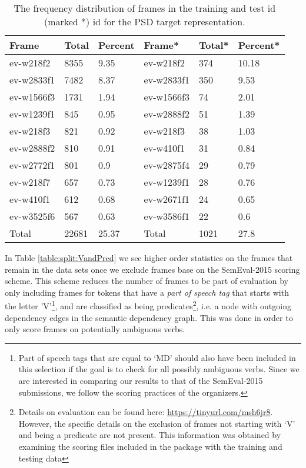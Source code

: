 \begin{table}
    \centering
    \smaller[0.7]
    \begin{tabular}{@{}llllll@{}}
        \toprule
        \textbf{Frame} & \textbf{Total} & \textbf{Percent} & \textbf{Frame*} & \textbf{Total*} & \textbf{Percent*} \\
        \midrule
        ev-w218f2 & 8355 & 9.35 & ev-w218f2 & 374 & 10.18 \\
        ev-w2833f1 & 7482 & 8.37 & ev-w2833f1 & 350 & 9.53 \\
        ev-w1566f3 & 1731 & 1.94 & ev-w1566f3 & 74 & 2.01 \\
        ev-w1239f1 & 845 & 0.95 & ev-w2888f2 & 51 & 1.39 \\
        ev-w218f3 & 821 & 0.92 & ev-w218f3 & 38 & 1.03 \\
        ev-w2888f2 & 810 & 0.91 & ev-w410f1 & 31 & 0.84 \\
        ev-w2772f1 & 801 & 0.9 & ev-w2875f4 & 29 & 0.79 \\
        ev-w218f7 & 657 & 0.73 & ev-w1239f1 & 28 & 0.76 \\
        ev-w410f1 & 612 & 0.68 & ev-w2671f1 & 24 & 0.65 \\
        ev-w3525f6 & 567 & 0.63 & ev-w3586f1 & 22 & 0.6 \\
        \midrule
        Total & 22681 & 25.37  & Total & 1021 & 27.8 \\
        \bottomrule
    \end{tabular}
    \caption{The frequency distribution of frames in the training and test id (marked *) id for the PSD target representation.}
    \label{table:psd_frames_freq}
\end{table}

In Table \ref{table:split:VandPred} we see higher order statistics on the frames that remain in the data sets once we exclude frames base on the SemEval-2015 scoring scheme. This scheme reduces the number of frames to be part of evaluation by only including frames for tokens that have a \textit{part of speech tag} that starts with the letter 'V'\footnote{Part of speech tags that are equal to `MD' should also have been included in this selection if the goal is to check for all possibly ambiguous verbs. Since we are interested in comparing our results to that of the SemEval-2015 submissions, we follow the scoring practices of the organizers.}, and are classified as being predicates\footnote{Details on evaluation can be found here: \url{https://tinyurl.com/msh6jr8}. However, the specific details on the exclusion of frames not starting with `V' and being a predicate are not present. This information was obtained by examining the scoring files included in the package with the training and testing data}, i.e. a node with outgoing dependency edges in the semantic dependency graph. This was done in order to only score frames on potentially ambiguous verbs.

